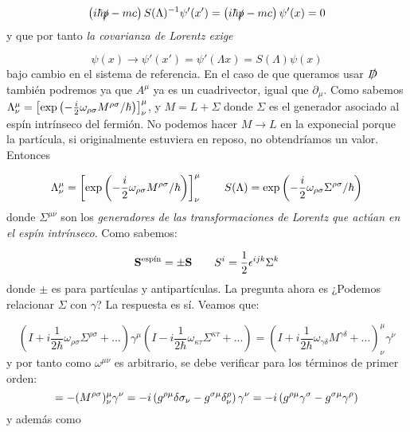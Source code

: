 \begin{equation}
	\left( i\hbar\slashed{p}-mc \right)S(\Lambda)^{-1} \psi'(x')=	\left( i\hbar\slashed{p}-mc \right) \psi'(x) =0
\end{equation}
y que por tanto \textit{la covarianza de Lorentz exige}

\begin{equation}
	\psi (x) \rightarrow \psi'(x') = \psi'(\Lambda x) = S(\Lambda) \psi(x)
\end{equation}
bajo cambio en el sistema de referencia. En el caso de que queramos usar $\slashed{D}$ también podremos ya que $A^\mu$ ya es un cuadrivector, igual que $\partial_\mu$. Como sabemos $ \Lambda^\mu_\nu =\left[ \exp\left( -\frac{i}{2}\omega_{\rho \sigma} M^{\rho \sigma}/\hbar \right) \right]^\mu_\nu $, y $M=L+\Sigma$ donde $\Sigma$ es el generador asociado al espín intrínseco del fermión. No podemos hacer $M\rightarrow L$ en la exponecial porque la partícula, si originalmente estuviera en reposo, no obtendríamos un valor. Entonces 

\begin{equation}
	\Lambda^\mu_\nu= \left[  \exp\left( -\frac{i}{2}\omega_{\rho \sigma} M^{\rho \sigma}/\hbar \right)  \right]^{\mu}_\nu
	\qquad
	S(\Lambda) = \exp\left( -\frac{i}{2}\omega_{\rho \sigma} \Sigma^{\rho \sigma}/\hbar \right)
\end{equation}
donde $\Sigma^{\mu \nu}$ son los \textit{generadores de las transformaciones de Lorentz que actúan en el espín intrínseco}. Como sabemos:

\begin{equation}
	\mathbf{S}^{\text{espín}}  = \pm \mathbf{S} \qquad S^i = \frac{1}{2} \epsilon^{ijk} \Sigma^k
\end{equation}
donde $\pm$ es para partículas y antipartículas. La pregunta ahora es ¿Podemos relacionar $\Sigma$ con $\gamma$? La respuesta es sí. Veamos que:

\begin{equation}
	(I+i\frac{1}{2\hbar}\omega_{\rho \sigma}\Sigma^{\rho\sigma}+...)\gamma^{\mu}
	(I-i\frac{1}{2\hbar}\omega_{\kappa \tau}\Sigma^{\kappa\tau}+...)=
	(I+i\frac{1}{2\hbar}\omega_{\gamma \delta}M^{\gamma\delta}+...)^\mu_\nu \gamma^\nu
\end{equation} 
y por tanto como $\omega^{\mu \nu}$ es arbitrario, se debe verificar para los términos de primer orden:
\begin{equation}
	[\Sigma^{\rho \sigma},\gamma_\mu] = -(M^{\rho \sigma})^\mu_\nu \gamma^\nu = - i \parentesis{g^{\rho \mu} \delta{\sigma}_\nu - g^{\sigma \mu}\delta^{\rho}_\nu} \gamma^\nu = - i \parentesis{g^{\rho \mu} \gamma^\sigma - g^{\sigma \mu} \gamma^{\rho}}
\end{equation}
y además como

